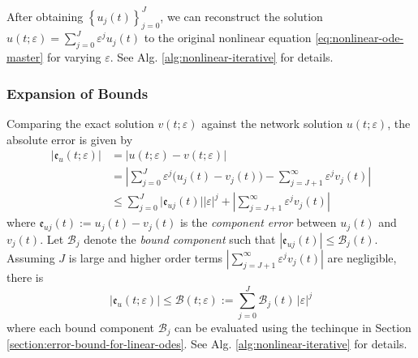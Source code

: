 \documentclass[accepted]{uai2023}
\newcommand{\Err}{\mathfrak{e}}
\newcommand{\Bound}{\mathcal{B}}
\begin{document}
    After obtaining $\left\{u_j(t)\right\}_{j=0}^{J}$, we can reconstruct the solution $u(t;\varepsilon) = \sum_{j=0}^{J} \varepsilon^j u_j(t)$ to the original nonlinear equation \ref{eq:nonlinear-ode-master} for varying $\varepsilon$.
    See Alg. \ref{alg:nonlinear-iterative} for details.

\subsubsection{Expansion of Bounds}
    Comparing the exact solution $v(t; \varepsilon)$ against the network solution $u(t; \varepsilon)$, the absolute error is given by 
    {
        \small
        \begin{align}
            |\Err_u(t; \varepsilon)| &= \big|u(t; \varepsilon) - v(t; \varepsilon)\big| \nonumber \\[-0.25em]
            &= \left|\sum_{j=0}^{J} \varepsilon^{j} \Big(u_j(t) - v_j(t)\Big) - \sum_{j=J+1}^{\infty} \varepsilon^j v_j(t)\right| \nonumber \\[-0.5em]
            &\leq \sum_{j=0}^{J} \Big|\Err_{uj}(t)\Big||\varepsilon|^j + \left|\sum_{j=J+1}^{\infty}\varepsilon^j v_j(t)\right| 
        \end{align}
    }
    where $\Err_{uj}(t) := u_j(t) - v_j(t)$ is the \textit{component error} between $u_j(t)$ and $v_j(t)$.
    Let $\Bound_{j}$ denote the \textit{bound component} such that $|\Err_{uj}(t)| \leq \Bound_j(t)$.
    Assuming $J$ is large and higher order terms $\left|\sum_{j=J+1}^{\infty}\varepsilon^j v_j(t)\right|$ are negligible, there is 
    {
        \small
        \begin{equation} \label{eq:nonlinear-bound-components}
            \Big|\Err_u(t; \varepsilon)\Big| \leq \Bound(t; \varepsilon) := \sum_{j=0}^{J} \Bound_j(t)\,|\varepsilon|^j 
        \end{equation}
    }
    where each bound component $\Bound_j$ can be evaluated using the techinque in Section \ref{section:error-bound-for-linear-odes}. 
    See Alg. \ref{alg:nonlinear-iterative} for details.
\end{document}
